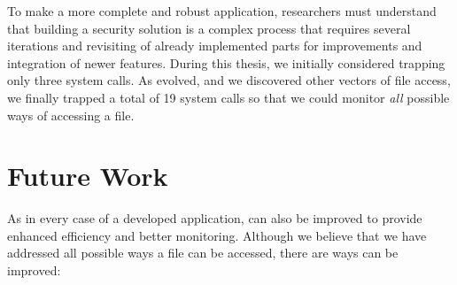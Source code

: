 \par To make a more complete and robust application, researchers must understand that building a security solution is a complex process that requires several iterations and revisiting of already implemented parts for improvements and integration of newer features. During this thesis, we initially considered trapping only three system calls. As  evolved, and we discovered other vectors of file access, we finally trapped a total of 19 system calls so that we could monitor \emph{all} possible ways of accessing a file.


\section{Future Work}

\par As in every case of a developed application,  can also be improved to provide enhanced efficiency and better monitoring. Although we believe that we have addressed all possible ways a file can be accessed, there are ways  can be improved:

